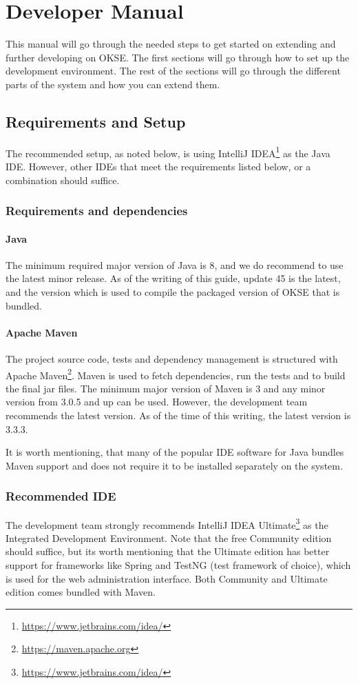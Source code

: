 \chapter{Developer Manual}
This manual will go through the needed steps to get started on extending and further developing on OKSE. The first sections will go through how to set up the development environment. The rest of the sections will go through the different parts of the system and how you can extend them.

\section{Requirements and Setup}
The recommended setup, as noted below, is using IntelliJ IDEA\footnote{\url{https://www.jetbrains.com/idea/}} as the Java IDE. However, other IDEs that meet the requirements listed below, or a combination should suffice. 

\subsection{Requirements and dependencies}

\subsubsection{Java}
The minimum required major version of Java is 8, and we do recommend to use the latest minor release. As of the writing of this guide, update 45 is the latest, and the version which is used to compile the packaged version of OKSE that is bundled.

\subsubsection{Apache Maven}
The project source code, tests and dependency management is structured with Apache Maven\footnote{\url{https://maven.apache.org}}. Maven is used to fetch dependencies, run the tests and to build the final jar files. The minimum major version of Maven is 3 and any minor version from 3.0.5 and up can be used. However, the development team recommends the latest version. As of the time of this writing, the latest version is 3.3.3.

It is worth mentioning, that many of the popular IDE software for Java bundles Maven support and does not require it to be installed separately on the system.

\subsection{Recommended IDE}
The development team strongly recommends IntelliJ IDEA Ultimate\footnote{\url{https://www.jetbrains.com/idea/}} as the Integrated Development Environment. Note that the free Community edition should suffice, but its worth mentioning that the Ultimate edition has better support for frameworks like Spring and TestNG (test framework of choice), which is used for the web administration interface. Both Community and Ultimate edition comes bundled with Maven.

